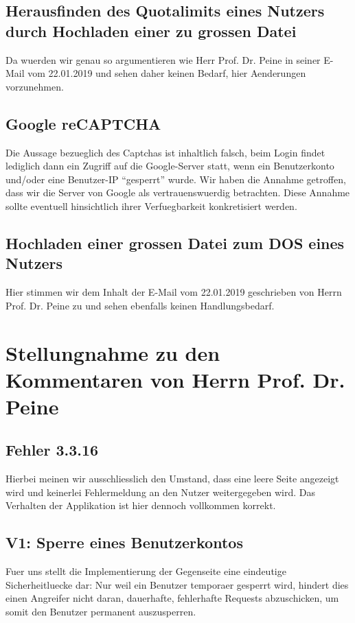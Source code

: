 \documentclass[12pt,DIV14,BCOR10mm,a4paper,parskip=half-,headsepline,headinclude,english,ngerman,bibliography=totocnumbered]{scrreprt}
\begin{document}
\section{Herausfinden des Quotalimits eines Nutzers durch Hochladen einer zu grossen Datei}

Da wuerden wir genau so argumentieren wie Herr Prof. Dr. Peine in seiner E-Mail vom 22.01.2019 und sehen daher keinen Bedarf, hier Aenderungen vorzunehmen.

\section{Google reCAPTCHA}

Die Aussage bezueglich des Captchas ist inhaltlich falsch, beim Login findet lediglich dann ein Zugriff auf die Google-Server statt, wenn ein Benutzerkonto und/oder eine Benutzer-IP \enquote{gesperrt} wurde.
Wir haben die Annahme getroffen, dass wir die Server von Google als vertrauenswuerdig betrachten.
Diese Annahme sollte eventuell hinsichtlich ihrer Verfuegbarkeit konkretisiert werden.

\section{Hochladen einer grossen Datei zum DOS eines Nutzers}

Hier stimmen wir dem Inhalt der E-Mail vom 22.01.2019 geschrieben von Herrn Prof. Dr. Peine zu und sehen ebenfalls keinen Handlungsbedarf.

\chapter{Stellungnahme zu den Kommentaren von Herrn Prof. Dr. Peine}

\section{Fehler 3.3.16}

Hierbei meinen wir ausschliesslich den Umstand, dass eine leere Seite angezeigt wird und keinerlei Fehlermeldung an den Nutzer weitergegeben wird.
Das Verhalten der Applikation ist hier dennoch vollkommen korrekt.

\section{V1: Sperre eines Benutzerkontos}

Fuer uns stellt die Implementierung der Gegenseite eine eindeutige Sicherheitluecke dar: Nur weil ein Benutzer temporaer gesperrt wird, hindert dies einen Angreifer nicht daran, dauerhafte, fehlerhafte Requests abzuschicken, um somit den Benutzer permanent auszusperren.
\end{document}
